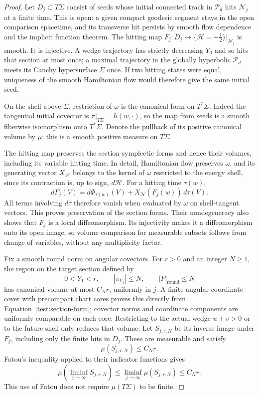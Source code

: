 \begin{proof}
Let $D_j\subset T\Sigma$ consist of seeds whose initial connected
track in $\mathcal P_d$ hits $\mathcal N_j$ at a finite time.
This is open: a given compact geodesic segment stays in the open
comparison spacetime, and its transverse hit persists by smooth flow
dependence and the implicit function theorem. The hitting map
$F_j:D_j\to\{\mathcal H=-\tfrac12\}\big|_{\mathcal N_j}$
is smooth. It is injective. A wedge trajectory has strictly
decreasing $Y_0$ and so hits that section at most once; a maximal
trajectory in the globally hyperbolic $\mathcal P_d$ meets its
Cauchy hypersurface $\Sigma$ once. If two hitting states were equal,
uniqueness of the smooth Hamiltonian flow would therefore give the
same initial seed.

On the shell above $\Sigma$, restriction of $\omega$ is the
canonical form on $T^*\Sigma$. Indeed the tangential initial
covector is $\pi|_{T\Sigma}=h(w,\cdot)$, so the map from seeds
is a smooth fiberwise isomorphism onto $T^*\Sigma$. Denote the
pullback of its positive canonical volume by $\mu$; this is a
smooth positive measure on $T\Sigma$.

The hitting map preserves the section symplectic forms and hence
their volumes, including its variable hitting time. In detail,
Hamiltonian flow preserves $\omega$, and its generating vector
$X_{\mathcal H}$ belongs to the kernel of $\omega$ restricted
to the energy shell, since its contraction is, up to sign,
$d\mathcal H$. For a hitting time $\tau(w)$,
\[
 dF_j(V)=d\Phi_{\tau(w)}(V)
               +X_{\mathcal H}(F_j(w))\,d\tau(V).
\]
All terms involving $d\tau$ therefore vanish when evaluated by
$\omega$ on shell-tangent vectors. This proves preservation of
the section forms. Their nondegeneracy also shows that $F_j$ is a
local diffeomorphism. Its injectivity makes it a diffeomorphism onto
its open image, so volume comparison for measurable subsets follows
from change of variables, without any multiplicity factor.

Fix a smooth round norm on angular covectors. For $r>0$ and an
integer $N\ge1$, the region on the target section defined by
\[
 0<Y_1<r,\qquad |\pi_{Y_1}|\le N,
                    \qquad |P|_{\mathrm{round}}\le N
\]
has canonical volume at most $C_Nr$, uniformly in $j$. A finite
angular coordinate cover with precompact chart cores proves this
directly from Equation~\eqref{test:section-form}; covector norms and
coordinate components are uniformly comparable on each core.
Restricting to the actual wedge $u+v>0$ or to the future shell only
reduces that volume. Let $S_{j,r,N}$ be its inverse image under
$F_j$, including only the finite hits in $D_j$. These are measurable
and satisfy
\begin{equation}\label{test:strip-volume}
 \mu(S_{j,r,N})\le C_Nr.
\end{equation}
Fatou's inequality applied to their indicator functions gives
\begin{equation}\label{test:fatou}
 \mu\!\left(\liminf_{j\to\infty}S_{j,r,N}\right)
 \le\liminf_{j\to\infty}\mu(S_{j,r,N})\le C_Nr.
\end{equation}
This use of Fatou does not require $\mu(T\Sigma)$ to be finite.


\end{proof}
